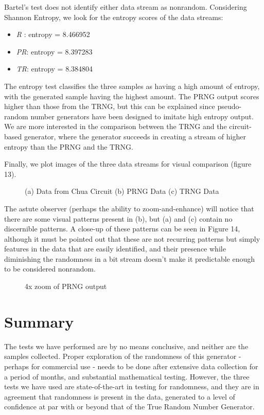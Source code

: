 \documentclass[jou,apacite]{apa6}
\begin{document}
Bartel's test does not identify either data stream as nonrandom. Considering Shannon Entropy, we look for the entropy scores of the data streams:

\begin{itemize}
\item \emph{R} : entropy = 8.466952
\item \emph{PR}: entropy = 8.397283
\item \emph{TR}: entropy = 8.384804
\end{itemize}

The entropy test classifies the three samples as having a high amount of entropy, with the generated sample having the highest amount. The PRNG output scores higher than those from the TRNG, but this can be explained since pseudo-random number generators have been designed to imitate high entropy output. We are more interested in the comparison between the TRNG and the circuit-based generator, where the generator succeeds in creating a stream of higher entropy than the PRNG and the TRNG.

Finally, we plot images of the three data streams for visual comparison (figure 13).

\begin{figure}[H]
\caption{(a) Data from Chua Circuit (b) PRNG Data (c) TRNG Data}
\endminipage\hfill
{}
\endminipage\hfill
{}
\endminipage
\end{figure}

The astute observer (perhaps the ability to zoom-and-enhance) will notice that there are some visual patterns present in (b), but (a) and (c) contain no discernible patterns. A close-up of these patterns can be seen in Figure 14, although it must be pointed out that these are not recurring patterns but simply features in the data that are easily identified, and their presence while diminishing the randomness in a bit stream doesn't make it predictable enough to be considered nonrandom.

\begin{figure}[H]
\caption{4x zoom of PRNG output}
\end{figure}

\section{Summary}

The tests we have performed are by no means conclusive, and neither are the samples collected. Proper exploration of the randomness of this generator - perhaps for commercial use - needs to be done after extensive data collection for a period of months, and substantial mathematical testing. However, the three tests we have used are state-of-the-art in testing for randomness, and they are in agreement that randomness is present in the data, generated to a level of confidence at par with or beyond that of the True Random Number Generator. 
\end{document}
